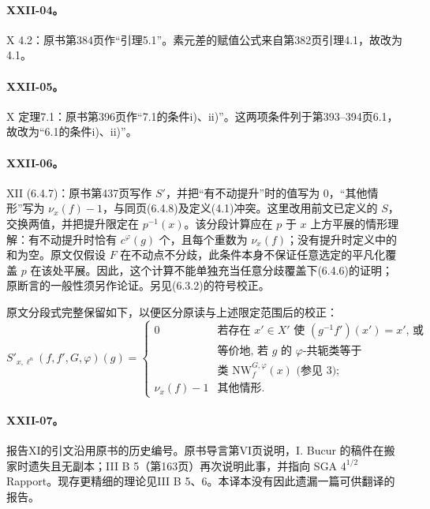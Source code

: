 \hypertarget{collation-XXII-04}{}

\paragraph*{XXII-04。}

X 4.2：原书第384页作“引理5.1”。素元差的赋值公式来自第382页引理4.1，故改为4.1。

\hypertarget{collation-XXII-05}{}

\paragraph*{XXII-05。}

X 定理7.1：原书第396页作“7.1的条件i)、ii)”。这两项条件列于第393--394页6.1，故改为“6.1的条件i)、ii)”。

\hypertarget{collation-XXII-06}{}

\paragraph*{XXII-06。}

XII (6.4.7)：原书第437页写作 $S'$，并把“有不动提升”时的值写为 $0$，“其他情形”写为 $\nu_x(f)-1$，与同页(6.4.8)及定义(4.1)冲突。这里改用前文已定义的 $S$，交换两值，并把提升限定在 $p^{-1}(x)$。该分段计算应在 $p$ 于 $x$ 上方平展的情形理解：有不动提升时恰有 $c^\varphi(g)$ 个，且每个重数为 $\nu_x(f)$；没有提升时定义中的和为空。原文仅假设 $F$ 在不动点不分歧，此条件本身不保证任意选定的平凡化覆盖 $p$ 在该处平展。因此，这个计算不能单独充当任意分歧覆盖下(6.4.6)的证明；原断言的一般性须另作论证。另见(6.3.2)的符号校正。

原文分段式完整保留如下，以便区分原读与上述限定范围后的校正：
\[
S'_{x,\ell^n}(f,f',G,\varphi)(g)=
\begin{cases}
0&\text{若存在 }x'\in X'\text{ 使 }(g^{-1}f')(x')=x'\text{, 或}\\
&\text{等价地, 若 $g$ 的 $\varphi$-共轭类等于}\\
&\text{类 }\mathrm{NW}_{f}^{G,\varphi}(x)\text{ (参见 3); }\\
\nu_x(f)-1&\text{其他情形.}
\end{cases}
\]

\hypertarget{collation-XXII-07}{}

\paragraph*{XXII-07。}

报告XI的引文沿用原书的历史编号。原书导言第VI页说明，I. Bucur 的稿件在搬家时遗失且无副本；III B 5（第163页）再次说明此事，并指向 SGA $4^{1/2}$ Rapport。现存更精细的理论见III B 5、6。本译本没有因此遗漏一篇可供翻译的报告。

